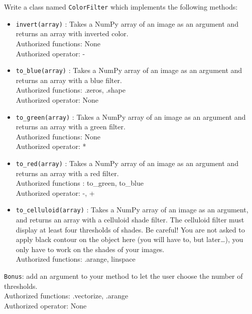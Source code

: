 \documentclass[]{article}
\begin{document}
Write a class named \texttt{ColorFilter} which implements the following
methods:

\begin{itemize}
\item
  \texttt{invert(array)} : Takes a NumPy array of an image as an
  argument and returns an array with inverted color.\\
  Authorized functions: None\\
  Authorized operator: -
\item
  \texttt{to\_blue(array)} : Takes a NumPy array of an image as an
  argument and returns an array with a blue filter.\\
  Authorized functions: .zeros, .shape\\
  Authorized operator: None
\item
  \texttt{to\_green(array)} : Takes a NumPy array of an image as an
  argument and returns an array with a green filter.\\
  Authorized functions: None\\
  Authorized operator: *
\item
  \texttt{to\_red(array)} : Takes a NumPy array of an image as an
  argument and returns an array with a red filter.\\
  Authorized functions : to\_green, to\_blue\\
  Authorized operator: -, +
\item
  \texttt{to\_celluloid(array)} : Takes a NumPy array of an image as an
  argument, and returns an array with a celluloid shade filter. The
  celluloid filter must display at least four thresholds of shades. Be
  careful! You are not asked to apply black contour on the object here
  (you will have to, but later\ldots{}), you only have to work on the
  shades of your images.\\
  Authorized functions: .arange, linspace
\end{itemize}

\texttt{Bonus}: add an argument to your method to let the user choose
the number of thresholds.\\
Authorized functions: .vectorize, .arange\\
Authorized operator: None
\end{document}
